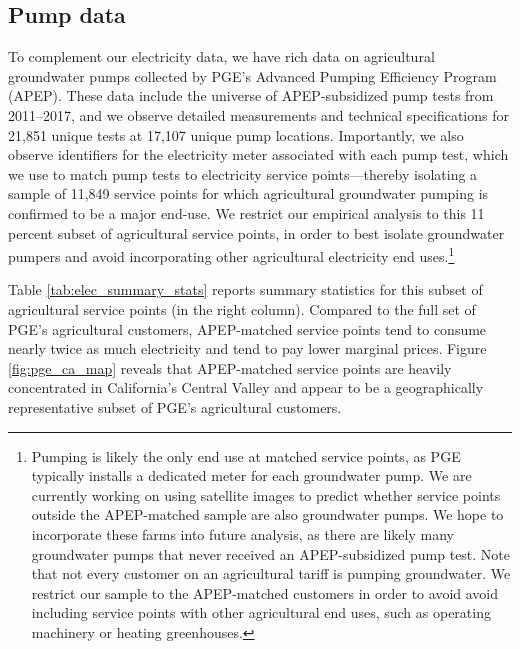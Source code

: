  
 
\subsection{Pump data}

To complement our electricity data, we have rich data on agricultural groundwater pumps collected by PGE's Advanced Pumping Efficiency Program (APEP). These data include the universe of APEP-subsidized pump tests from 2011--2017, and we observe detailed measurements and technical specifications for 21,851 unique tests at 17,107 unique pump locations. Importantly, we also observe identifiers for the electricity meter associated with each pump test, which we use to match pump tests to electricity service points---thereby isolating a sample of 11,849 service points for which agricultural groundwater pumping is confirmed to be a major end-use. We restrict our empirical analysis to this 11 percent subset of agricultural service points, in order to best isolate groundwater pumpers and avoid incorporating other agricultural electricity end uses.\footnote{
Pumping is likely the only end use at matched service points, as PGE typically installs a dedicated meter for each groundwater pump. We are currently working on using satellite images to predict whether service points outside the APEP-matched sample are also groundwater pumps. We hope to incorporate these farms into future analysis, as there are likely many groundwater pumps that never received an APEP-subsidized pump test. Note that not every customer on an agricultural tariff is pumping groundwater. We restrict our sample to the APEP-matched customers in order to avoid avoid including service points with other agricultural end uses, such as operating machinery or heating greenhouses.}


Table \ref{tab:elec_summary_stats} reports summary statistics for this subset of agricultural service points (in the right column). Compared to the full set of PGE's agricultural customers, APEP-matched service points tend to consume nearly twice as much electricity and tend to pay lower marginal prices. %
Figure \ref{fig:pge_ca_map} reveals that APEP-matched service points are heavily concentrated in California's Central Valley and appear to be a geographically representative subset of PGE's agricultural customers.

